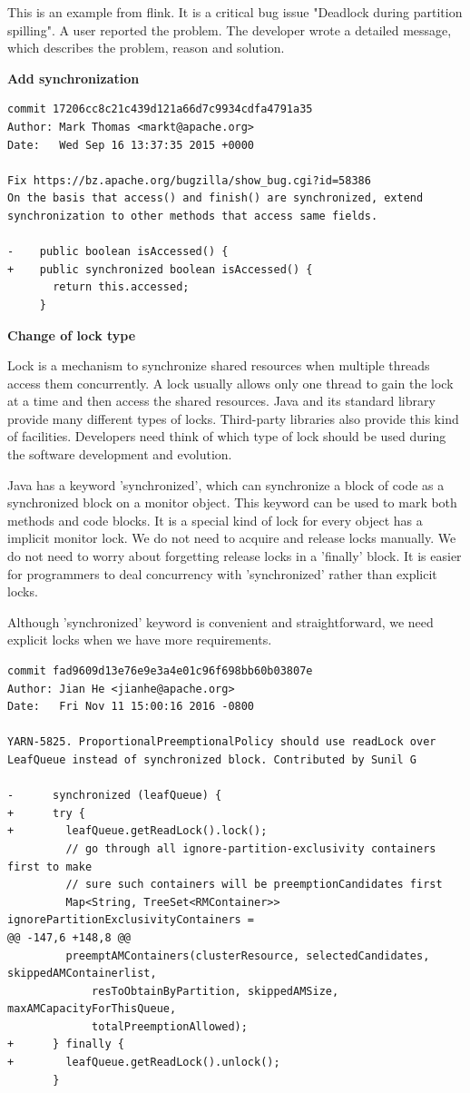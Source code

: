 \documentclass[conference]{IEEEtran}
\begin{document}
This is an example from flink. It is a critical bug issue "Deadlock during partition spilling". A user reported the problem. The developer wrote a detailed message, which describes the problem, reason and solution.

\textbf{Add synchronization}
\begin{lstlisting}
commit 17206cc8c21c439d121a66d7c9934cdfa4791a35
Author: Mark Thomas <markt@apache.org>
Date:   Wed Sep 16 13:37:35 2015 +0000

Fix https://bz.apache.org/bugzilla/show_bug.cgi?id=58386
On the basis that access() and finish() are synchronized, extend synchronization to other methods that access same fields.

-    public boolean isAccessed() {
+    public synchronized boolean isAccessed() {
       return this.accessed;
     }
\end{lstlisting}

\textbf{Change of lock type}

Lock is a mechanism to synchronize shared resources when multiple threads access them concurrently. A lock usually allows only one thread to gain the lock at a time and then access the shared resources. Java and its standard library provide many different types of locks. Third-party libraries also provide this kind of facilities. Developers need think of which type of lock should be used during the software development and evolution.

Java has a keyword 'synchronized', which can synchronize a block of code as a synchronized block on a monitor object. This keyword can be used to mark both methods and code blocks. It is a special kind of lock for every object has a implicit monitor lock. We do not need to acquire and release locks manually. We do not need to worry about forgetting release locks in a 'finally' block. It is easier for programmers to deal concurrency with 'synchronized' rather than explicit locks.

Although 'synchronized' keyword is convenient and straightforward, we need explicit locks when we have more requirements. 

\begin{lstlisting}
commit fad9609d13e76e9e3a4e01c96f698bb60b03807e
Author: Jian He <jianhe@apache.org>
Date:   Fri Nov 11 15:00:16 2016 -0800

YARN-5825. ProportionalPreemptionalPolicy should use readLock over LeafQueue instead of synchronized block. Contributed by Sunil G

-      synchronized (leafQueue) {
+      try {
+        leafQueue.getReadLock().lock();
         // go through all ignore-partition-exclusivity containers first to make
         // sure such containers will be preemptionCandidates first
         Map<String, TreeSet<RMContainer>> ignorePartitionExclusivityContainers =
@@ -147,6 +148,8 @@
         preemptAMContainers(clusterResource, selectedCandidates, skippedAMContainerlist,
             resToObtainByPartition, skippedAMSize, maxAMCapacityForThisQueue,
             totalPreemptionAllowed);
+      } finally {
+        leafQueue.getReadLock().unlock();
       }
\end{lstlisting}
\end{document}
